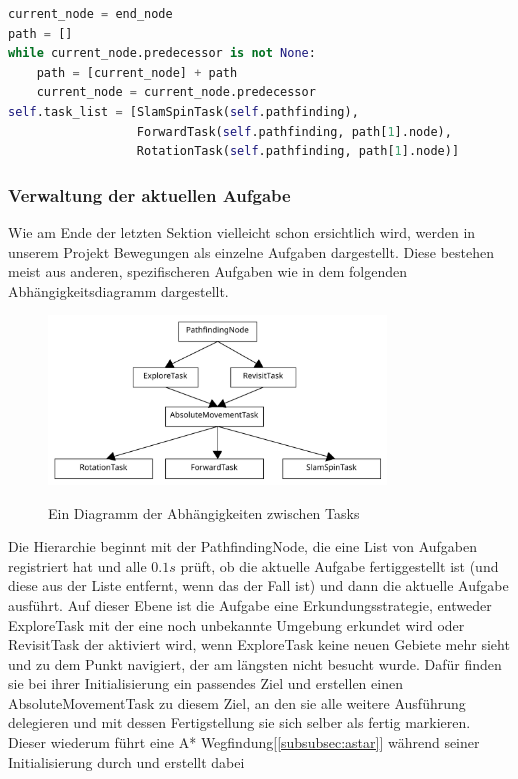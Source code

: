 \begin{lstlisting}[language=python,label={lst:pathfinding}]
current_node = end_node
path = []
while current_node.predecessor is not None:
    path = [current_node] + path
    current_node = current_node.predecessor
self.task_list = [SlamSpinTask(self.pathfinding),
                  ForwardTask(self.pathfinding, path[1].node),
                  RotationTask(self.pathfinding, path[1].node)]
\end{lstlisting}
\subsubsection{Verwaltung der aktuellen Aufgabe} \label{subsubsec:taskmanagement}
Wie am Ende der letzten Sektion vielleicht schon ersichtlich wird, werden in unserem Projekt Bewegungen als einzelne
Aufgaben dargestellt.
Diese bestehen meist aus anderen, spezifischeren Aufgaben wie in dem folgenden Abhängigkeitsdiagramm dargestellt.
\begin{figure}[h]
    \caption{Ein Diagramm der Abhängigkeiten zwischen Tasks}
\includegraphics[width=0.8\textwidth]{img/TaskDiagram}\label{fig:taskdiagram}
\centering
\end{figure}
Die Hierarchie beginnt mit der PathfindingNode, die eine List von Aufgaben registriert hat und alle $0.1s$ prüft, ob die
aktuelle Aufgabe fertiggestellt ist (und diese aus der Liste entfernt, wenn das der Fall ist) und dann die aktuelle
Aufgabe ausführt.
Auf dieser Ebene ist die Aufgabe eine Erkundungsstrategie, entweder ExploreTask mit der eine noch unbekannte Umgebung
erkundet wird oder RevisitTask der aktiviert wird, wenn ExploreTask keine neuen Gebiete mehr sieht und zu dem Punkt
navigiert, der am längsten nicht besucht wurde.
Dafür finden sie bei ihrer Initialisierung ein passendes Ziel und erstellen einen AbsoluteMovementTask zu diesem Ziel,
an den sie alle weitere Ausführung delegieren und mit dessen Fertigstellung sie sich selber als fertig markieren.
Dieser wiederum führt eine A* Wegfindung[\ref{subsubsec:astar}] während seiner Initialisierung durch und erstellt dabei
